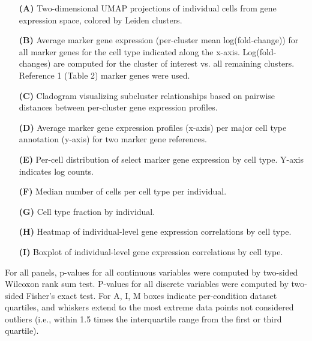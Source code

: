 \begin{itemize}
    \item[\textbf{(A)}] Two-dimensional UMAP projections of individual cells from gene expression space, colored by Leiden clusters. 
    \item[\textbf{(B)}] Average marker gene expression (per-cluster mean log(fold-change)) for all marker genes for the cell type indicated along the x-axis. Log(fold-changes) are computed for the cluster of interest vs. all remaining clusters. Reference 1 (Table 2) marker genes were used. 
    \item[\textbf{(C)}] Cladogram visualizing subcluster relationships based on pairwise distances between per-cluster gene expression profiles. 
    \item[\textbf{(D)}] Average marker gene expression profiles (x-axis) per major cell type annotation (y-axis) for two marker gene references. 
    \item[\textbf{(E)}] Per-cell distribution of select marker gene expression by cell type. Y-axis indicates log counts. 
    \item[\textbf{(F)}] Median number of cells per cell type per individual. 
    \item[\textbf{(G)}] Cell type fraction by individual. 
    \item[\textbf{(H)}] Heatmap of individual-level gene expression correlations by cell type. 
    \item[\textbf{(I)}] Boxplot of individual-level gene expression correlations by cell type. 
\end{itemize}
For all panels, p-values for all continuous variables were computed by two-sided Wilcoxon rank sum test. 
P-values for all discrete variables were computed by two-sided Fisher’s exact test. 
For A, I, M boxes indicate per-condition dataset quartiles, and whiskers extend to the most extreme data points not considered outliers (i.e., within 1.5 times the interquartile range from the first or third quartile).